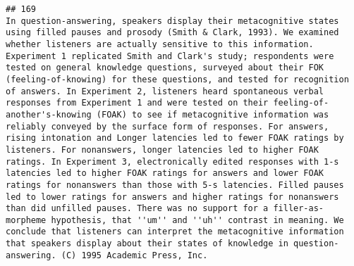 \documentclass[
  english,
  man]{apa6}
\begin{document}
\begin{verbatim}
## 169                                                                                                                                                                                                                                                                                                                                                                                                                                                                                                                                                                                                                                                                                                                                                                                                                                                                                                                                                                                                                                                                                                                                                                                                                                                              In question-answering, speakers display their metacognitive states using filled pauses and prosody (Smith & Clark, 1993). We examined whether listeners are actually sensitive to this information. Experiment 1 replicated Smith and Clark's study; respondents were tested on general knowledge questions, surveyed about their FOK (feeling-of-knowing) for these questions, and tested for recognition of answers. In Experiment 2, listeners heard spontaneous verbal responses from Experiment 1 and were tested on their feeling-of-another's-knowing (FOAK) to see if metacognitive information was reliably conveyed by the surface form of responses. For answers, rising intonation and Longer latencies led to fewer FOAK ratings by listeners. For nonanswers, longer latencies led to higher FOAK ratings. In Experiment 3, electronically edited responses with 1-s latencies led to higher FOAK ratings for answers and lower FOAK ratings for nonanswers than those with 5-s latencies. Filled pauses led to lower ratings for answers and higher ratings for nonanswers than did unfilled pauses. There was no support for a filler-as-morpheme hypothesis, that ''um'' and ''uh'' contrast in meaning. We conclude that listeners can interpret the metacognitive information that speakers display about their states of knowledge in question-answering. (C) 1995 Academic Press, Inc.

\end{verbatim}
\end{document}
